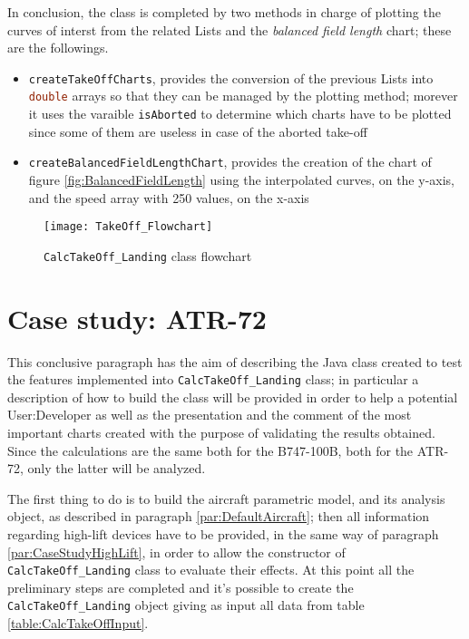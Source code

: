 \bigskip
\noindent
In conclusion, the class is completed by two methods in charge of plotting the curves of interst from the related \gls{List}s and the \emph{balanced field length} chart; these are the followings.
%
\begin{itemize}
\item \lstinline[language=Java]!createTakeOffCharts!, provides the conversion of the previous \gls{List}s into \lstinline[language=Java]!double! arrays so that they can be managed by the plotting method; morever it uses the varaible \lstinline[language=Java]!isAborted! to determine which charts have to be plotted since some of them are useless in case of the aborted take-off
\item \lstinline[language=Java]!createBalancedFieldLengthChart!, provides the creation of the chart of figure \ref{fig:BalancedFieldLength} using the interpolated curves, on the y-axis, and the speed array with 250 values, on the x-axis 
\end{itemize}
%
\begin{figure}[H]
\centering
\texttt{[image: TakeOff\_Flowchart]}
\caption{\lstinline[language=Java]!CalcTakeOff_Landing! class flowchart}
\label{fig:CalcTakeOffFlowchart}
\end{figure}
%
\section{Case study: ATR-72}
This conclusive paragraph has the aim of describing the Java class created to test the features implemented into \lstinline[language=Java]!CalcTakeOff_Landing! class; in particular a description of how to build the class will be provided in order to help a potential \gls{User:Developer} as well as the presentation and the comment of the most important charts created with the purpose of validating the results obtained. 
%
Since the calculations are the same both for the B747-100B, both for the ATR-72, only the latter will be analyzed. 

\noindent
The first thing to do is to build the aircraft parametric model, and its analysis object, as described in paragraph \ref{par:DefaultAircraft}; then all information regarding high-lift devices have to be provided, in the same way of paragraph \ref{par:CaseStudyHighLift}, in order to allow the constructor of \lstinline[language=Java]!CalcTakeOff_Landing! class to evaluate their effects. 
%
At this point all the preliminary steps are completed and it's possible to create the \lstinline[language=Java]!CalcTakeOff_Landing! object giving as input all data from table \ref{table:CalcTakeOffInput}.

